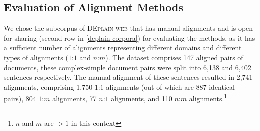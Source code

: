 \documentclass[11pt]{article}
\newcommand{\RS}[1]{\textcolor{violet}{RS: #1}}
\begin{document}
\begin{comment}
\paragraph{BertAlign \cite{10.1093/llc/fqac089}}
is a very new attempt to allow sentence-transformer-based methods to produce n:m alignments. It was tested on Chinese-English comparable corpora and showed promising results.
Our adaptation of this method was only by using a dedicated German sentence transformer model in the algorithm procedure.


\paragraph{MASSAlign}\cite{}
\RS{Lorem ipsum dolor sit amet, consectetur adipiscing elit. Nunc id ligula eget nibh ultrices consectetur sit amet sed enim. Nam ultricies facilisis mi elementum accumsan. Quisque fermentum pulvinar pellentesque. Donec consectetur, velit sed condimentum interdum, eros quam rutrum nunc.}

\paragraph{CATS}
\RS{Lorem ipsum dolor sit amet, consectetur adipiscing elit. Nunc id ligula eget nibh ultrices consectetur sit amet sed enim. Nam ultricies facilisis mi elementum accumsan. Quisque fermentum pulvinar pellentesque. Donec consectetur, velit sed condimentum interdum, eros quam rutrum nunc.}
\end{comment}

\subsection{Evaluation of Alignment Methods}
\label{sec-auto-alignment-eval}




We chose 
the subcorpus of \textsc{DEplain-web} that has manual alignments and is open for sharing (second row in \autoref{deplain-corpora}) for evaluating the methods, as it has a sufficient number of alignments representing different domains and different types of alignments ($1$:$1$ and $n$:$m$). The dataset comprises 147 aligned pairs of documents, these complex-simple document pairs were split into 6,138 and 6,402 sentences respectively.
The manual alignment of these sentences resulted in 2,741 alignments, comprising 1,750 $1$:$1$ alignments (out of which are 887 identical pairs), 804 $1$:$m$ alignments, 77 $n$:$1$ alignments, and 110 $n$:$m$ alignments.\footnote{$n$ and $m$ are $>1$ in this context}
\end{document}
